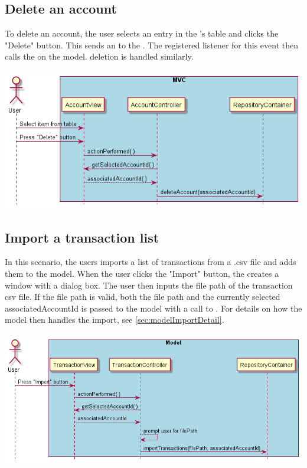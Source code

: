 \documentclass[12pt]{article}
\begin{document}
\subsection{Delete an account}
To delete an account, the user selects an entry in the 's table and clicks the "Delete" button. This sends an  to the . The registered listener for this event then calls the  on the model.  deletion is handled similarly.\\
\\
\includegraphics[width=\textwidth,height=\textheight,keepaspectratio]{diagrams/sequence/deleteAccount.png}
\bigskip

\newpage
\subsection{Import a transaction list}
In this scenario, the users imports a list of transactions from a .csv file and adds them to the model. When the user clicks the "Import" button, the  creates a window with a dialog box. The user then inputs the file path of the transaction csv file. If the file path is valid, both the file path and the currently selected associatedAccountId is passed to the model with a call to . For details on how the model then handles the import, see \ref{sec:modelImportDetail}.\\
\\
\includegraphics[width=\textwidth,height=\textheight,keepaspectratio]{diagrams/sequence/importHighLevel.png}
\bigskip
\end{document}
